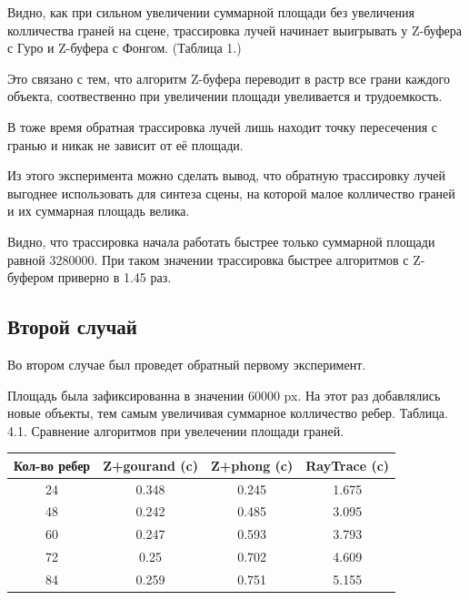 \documentclass[12pt]{report}
\begin{document}
	Видно, как при сильном увеличении суммарной площади без увеличения колличества граней на сцене, трассировка лучей начинает выигрывать у Z-буфера с Гуро и Z-буфера с Фонгом. (Таблица 1.)
	
	Это связано с тем, что алгоритм Z-буфера переводит в растр все грани каждого объекта, соотвественно при увеличении площади увеливается и трудоемкость.
	
	В тоже время обратная трассировка лучей лишь находит точку пересечения с гранью и никак не зависит от её площади.
	
	Из этого эксперимента можно сделать вывод, что обратную трассировку лучей выгоднее использовать для синтеза сцены, на которой малое колличество граней и их суммарная площадь велика.
	
	Видно, что трассировка начала работать быстрее только суммарной площади равной 3280000. При таком значении трассировка быстрее алгоритмов с Z-буфером приверно в 1.45 раз.
	
	\subsection{Второй случай}
	
	Во втором случае был проведет обратный первому эксперимент. 
	
	Площадь была зафиксированна в значении 60000 px. На этот раз добавлялись новые объекты, тем самым увеличивая суммарное колличество ребер.
	\newpage
		Таблица. 4.1. Сравнение алгоритмов при увелечении площади граней.
	
	\begin{center}
		\begin{tabular}{|c c c c|}
			\hline
			Кол-во ребер & Z+gourand (c) & Z+phong (c) & RayTrace (c) \\ [0.5ex]
			\hline
			24 & 0.348 & 0.245 & 1.675 \\ 
			\hline 
			48 & 0.242 & 0.485 & 3.095 \\ 
			\hline 
			60 & 0.247 & 0.593 & 3.793 \\ 
			\hline 
			72 & 0.25 & 0.702 & 4.609 \\ 
			\hline 
			84 & 0.259 & 0.751 & 5.155 \\ 
			\hline
		\end{tabular}
	\end{center}
\end{document}
